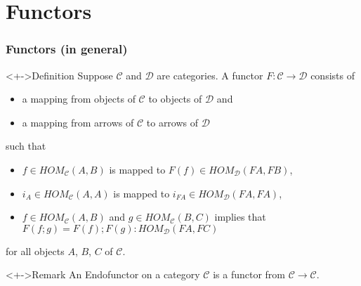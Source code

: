 \documentclass{beamer}
\begin{document}
\section{Functors}
\begin{frame}
  \frametitle{Functors (in general)}
  \begin{block}<+->{Definition}
    Suppose $\mathcal C$ and $\mathcal D$ are categories. 
    A \alert{functor} $F : \mathcal{C} \to \mathcal{D}$ consists of
    \begin{itemize}
    \item a mapping from objects of $\mathcal{C}$ to objects of
      $\mathcal{D}$ and
    \item a mapping from arrows of  $\mathcal{C}$ to arrows of
      $\mathcal{D}$
    \end{itemize}
    such that
    \begin{itemize}
    \item $f \in HOM_{\mathcal{C}}(A,B)$ is mapped to
      $F(f) \in HOM_{\mathcal{D}} (FA, FB)$,
    \item $i_A \in HOM_{\mathcal{C}}(A,A)$ is mapped to
      $i_{FA} \in HOM_{\mathcal{D}} (FA, FA)$,
    \item $f \in HOM_{\mathcal{C}}(A,B)$ and  $g \in
      HOM_{\mathcal{C}}(B,C)$ implies that
      $F (f; g) = F(f); F(g) : HOM_{\mathcal{D}} (FA, FC)$
    \end{itemize}
    for all objects $A$, $B$, $C$ of $\mathcal C$.
  \end{block}
  \begin{exampleblock}<+->{Remark}
    An \alert{Endofunctor} on a category $\mathcal{C}$ is a functor from $\mathcal{C} \to \mathcal{C}$.
  \end{exampleblock}
\end{frame}
\end{document}
